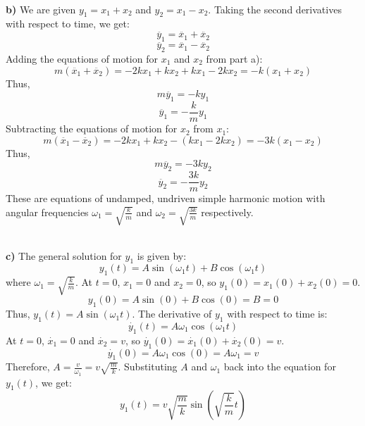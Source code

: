 \documentclass{article}
\begin{document}
\\
\textbf{b)}
We are given $y_1 = x_1 + x_2$ and $y_2 = x_1 - x_2$. Taking the second derivatives with respect to time, we get:
\begin{equation}
\ddot{y_1} = \ddot{x_1} + \ddot{x_2}
\end{equation}
\begin{equation}
\ddot{y_2} = \ddot{x_1} - \ddot{x_2}
\end{equation}
Adding the equations of motion for $x_1$ and $x_2$ from part a):
\begin{equation}
m(\ddot{x_1} + \ddot{x_2}) = -2kx_1 + kx_2 + kx_1 - 2kx_2 = -k(x_1 + x_2)
\end{equation}
Thus,
\begin{equation}
m\ddot{y_1} = -ky_1
\end{equation}
\begin{equation}
\ddot{y_1} = -\frac{k}{m}y_1
\end{equation}
Subtracting the equations of motion for $x_2$ from $x_1$:
\begin{equation}
m(\ddot{x_1} - \ddot{x_2}) = -2kx_1 + kx_2 - (kx_1 - 2kx_2) = -3k(x_1 - x_2)
\end{equation}
Thus,
\begin{equation}
m\ddot{y_2} = -3ky_2
\end{equation}
\begin{equation}
\ddot{y_2} = -\frac{3k}{m}y_2
\end{equation}
These are equations of undamped, undriven simple harmonic motion with angular frequencies $\omega_1 = \sqrt{\frac{k}{m}}$ and $\omega_2 = \sqrt{\frac{3k}{m}}$ respectively.

\\
\textbf{c)}
The general solution for $y_1$ is given by:
\begin{equation}
y_1(t) = A\sin(\omega_1 t) + B\cos(\omega_1 t)
\end{equation}
where $\omega_1 = \sqrt{\frac{k}{m}}$.
At $t=0$, $x_1 = 0$ and $x_2 = 0$, so $y_1(0) = x_1(0) + x_2(0) = 0$.
\begin{equation}
y_1(0) = A\sin(0) + B\cos(0) = B = 0
\end{equation}
Thus, $y_1(t) = A\sin(\omega_1 t)$.
The derivative of $y_1$ with respect to time is:
\begin{equation}
\dot{y_1}(t) = A\omega_1\cos(\omega_1 t)
\end{equation}
At $t=0$, $\dot{x_1} = 0$ and $\dot{x_2} = v$, so $\dot{y_1}(0) = \dot{x_1}(0) + \dot{x_2}(0) = v$.
\begin{equation}
\dot{y_1}(0) = A\omega_1\cos(0) = A\omega_1 = v
\end{equation}
Therefore, $A = \frac{v}{\omega_1} = v\sqrt{\frac{m}{k}}$.
Substituting $A$ and $\omega_1$ back into the equation for $y_1(t)$, we get:
\begin{equation}
y_1(t) = v\sqrt{\frac{m}{k}}\sin(\sqrt{\frac{k}{m}}t)
\end{equation}
\end{document}
